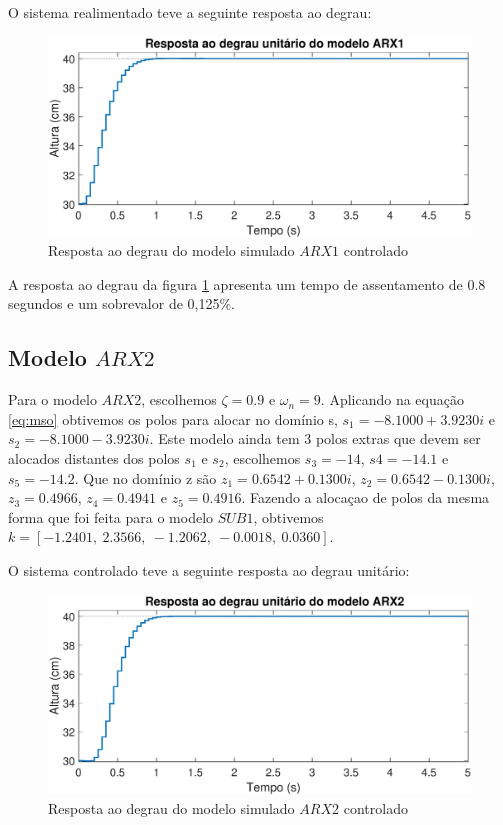 O sistema realimentado teve a seguinte resposta ao degrau:

\begin{figure}[H]
	\centering
	\includegraphics[width=1\linewidth]{respostadegrauarx1c}
	\caption[Resposta ao degrau do modelo simulado $ARX1$ controlado]{Resposta ao degrau do modelo simulado $ARX1$ controlado}
	\label{fig:respostadegrauarx1c}
\end{figure}


A resposta ao degrau da figura \ref{fig:respostadegrauarx1c} apresenta um tempo de assentamento de 0.8 segundos e um sobrevalor de 0,125\%.

\subsection{Modelo $ARX2$}\label{s:ctrlarx2}
Para o modelo $ARX2$, escolhemos $\zeta=0.9$ e $\omega_n=9$. Aplicando na equação \eqref{eq:mso} obtivemos os polos para alocar no domínio s, $s_1=-8.1000 + 3.9230i$ e $s_2=-8.1000 - 3.9230i$. Este modelo ainda tem 3 polos extras que devem ser alocados distantes dos polos $s_1$ e $s_2$, escolhemos $s_3=-14$, $s4=-14.1$ e $s_5=-14.2$. Que no domínio z são $z_1=0.6542 + 0.1300i$, $z_2=0.6542 - 0.1300i$, $z_3=0.4966$, $z_4=0.4941$ e $z_5=0.4916$. Fazendo a alocaçao de polos da mesma forma que foi feita para o modelo $SUB1$, obtivemos $k=[-1.2401,~2.3566,~-1.2062,~-0.0018,~0.0360]$.

O sistema controlado teve a seguinte resposta ao degrau unitário:

\begin{figure}[H]
	\centering
	\includegraphics[width=1\linewidth]{respostadegrauarx2c}
	\caption[Resposta ao degrau do modelo $ARX2$]{Resposta ao degrau do modelo simulado $ARX2$ controlado}
	\label{fig:respostadegrauarx2c}
\end{figure}

